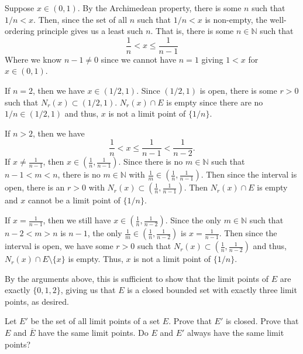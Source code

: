 \documentclass[12 pt, letterpaper]{hmcpset}
\begin{document}
\begin{solution}
	Suppose $x \in (0, 1)$. By the Archimedean property, there is some $n$ such that $1/n < x$. Then, since the set of all $n$ such that $1/n < x$ is non-empty, the well-ordering principle gives us a least such $n$. That is, there is some $n \in \mathbb{N}$ such that
	\[
		\frac{1}{n} < x \le \frac{1}{n - 1}
	\]
	Where we know $n - 1 \neq 0$ since we cannot have $n = 1$ giving $1 < x$ for $x \in (0, 1)$.

	If $n = 2$, then we have $x \in (1/2, 1)$. Since $(1/2, 1)$ is open, there is some $r > 0$ such that $N_{r}(x) \subset (1/2, 1)$. $N_{r}(x) \cap E$ is empty since there are no $1/n \in (1/2, 1)$ and thus, $x$ is not a limit point of $\{ 1/n \}$.

	If $n > 2$, then we have
	\[
		\frac{1}{n} < x \le \frac{1}{n - 1} < \frac{1}{n - 2}.
	\]
	If $x \neq \frac{1}{n - 1}$, then $x \in \left ( \frac{1}{n}, \frac{1}{n - 1} \right )$. Since there is no $m \in \mathbb{N}$ such that $n - 1 < m < n$, there is no $m \in \mathbb{N}$ with $\frac{1}{m} \in \left ( \frac{1}{n}, \frac{1}{n - 1} \right )$. Then since the interval is open, there is an $r > 0$ with $N_{r}(x) \subset \left ( \frac{1}{n}, \frac{1}{n - 1} \right )$. Then $N_{r}(x) \cap E$ is empty and $x$ cannot be a limit point of $\{ 1/n \}$.

	If $x = \frac{1}{n - 1}$, then we still have $x \in \left ( \frac{1}{n}, \frac{1}{n - 2} \right )$. Since the only $m \in \mathbb{N}$ such that $n - 2 < m > n$ is  $n - 1$, the only $\frac{1}{m} \in \left ( \frac{1}{n}, \frac{1}{n - 2} \right )$ is $x = \frac{1}{n - 1}$. Then since the interval is open, we have  some $r > 0$ such that $N_{r}(x) \subset \left ( \frac{1}{n}, \frac{1}{n - 2} \right )$ and thus, $N_{r}(x) \cap E \setminus \{ x \}$ is empty. Thus, $x$ is not a limit point of $\{ 1/n \}$.

	By the arguments above, this is sufficient to show that the limit points of $E$ are exactly $\{ 0, 1, 2 \}$, giving us that $E$ is a closed bounded set with exactly three limit points, as desired.
\end{solution}

\pagebreak

\begin{problem}
	Let $E'$ be the set of all limit points of a set $E$. Prove that $E'$ is closed. Prove that $E$ and $\overline{E}$ have the same limit points. Do $E$ and $E'$ always have the same limit points?
\end{problem}
\end{document}
